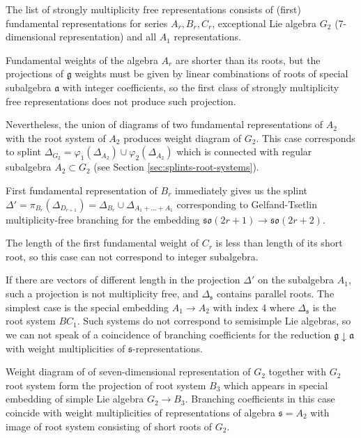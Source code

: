 \documentclass{article}
\newcommand{\gf}{\mathfrak{g}}
\newcommand{\af}{\mathfrak{a}}
\newcommand{\sfr}{\mathfrak{s}}
\begin{document}
The list of strongly multiplicity free representations consists of (first) fundamental representations
for series $A_{r}, B_{r}, C_{r}$, exceptional Lie algebra $G_{2}$ (7-dimensional representation) and
all $A_{1}$ representations. 

Fundamental weights of the algebra $A_{r}$ are shorter than its roots, but the projections of $\gf$
weights must be given by linear combinations of roots of special subalgebra $\af$ with integer
coefficients, so the first class of strongly multiplicity free representations does not produce such
projection. 

Nevertheless, the union of diagrams of two fundamental representations of $A_{2}$ with the root
system of $A_{2}$ produces weight diagram of $G_{2}$. This case corresponds to splint
$\Delta_{G_{2}}=\varphi_{1}( \Delta_{A_{2}})\cup \varphi_{2}(\Delta_{A_{2}})$ which is connected
with regular subalgebra $A_{2}\subset G_{2}$ (see Section \ref{sec:splints-root-systems}).


First fundamental representation of $B_{r}$ immediately gives us the splint $\Delta'=\pi_{B_{r}}\left(
\Delta_{D_{r+1}}\right) = \Delta_{B_{r}}\cup \Delta_{A_{1}+\dots+A_{1}}$ corresponding to Gelfand-Tsetlin
multiplicity-free branching for the embedding $\mathfrak{so}(2r+1)\to \mathfrak{so}(2r+2)$. 

The length of the first fundamental weight of  $C_{r}$ is less than length of its short root, so
this case can not correspond to integer subalgebra. 

If there are vectors of different length in the projection $\Delta'$ on the subalgebra $A_{1}$, such a
projection is not multiplicity free, and $\Delta_{\sfr}$ contains parallel roots. The simplest case
is the special embedding $A_{1}\to A_{2}$ with index 4 where $\Delta_{\sfr}$ is the root system
$BC_{1}$. Such systems do not correspond to semisimple Lie algebras, so we can not speak of a
coincidence of branching coefficients for the reduction $\gf\downarrow \af$ with weight
multiplicities of $\sfr$-representations.

Weight diagram of of seven-dimensional representation of $G_{2}$ together with $G_{2}$ root system
form the projection of root system $B_{3}$ which appears in special embedding of simple Lie algebra
$G_{2}\to B_{3}$. Branching coefficients in this case coincide with weight multiplicities of
representations of algebra $\sfr=A_{2}$ with image of root system consisting of short roots of
$G_{2}$. 
\end{document}
